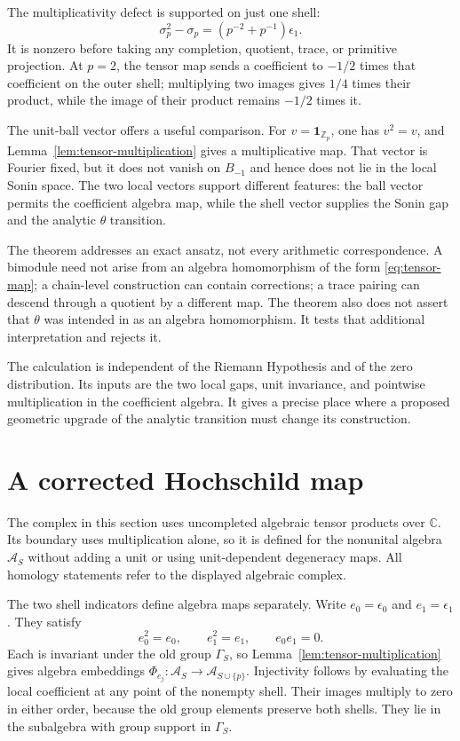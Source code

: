 \documentclass[11pt,letterpaper]{article}
\theoremstyle{definition}
\theoremstyle{remark}
\newcommand{\C}{\mathbb C}
\newcommand{\Z}{\mathbb Z}
\newcommand{\ind}{\mathbf1}
\begin{document}
The multiplicativity defect is supported on just one shell:
\begin{equation}\label{eq:sigma-square}
 \sigma_p^2-\sigma_p=(p^{-2}+p^{-1})\epsilon_1.
\end{equation}
It is nonzero before taking any completion, quotient, trace, or
primitive projection. At $p=2$, the tensor map sends a coefficient
to $-1/2$ times that coefficient on the outer shell; multiplying
two images gives $1/4$ times their product, while the image of
their product remains $-1/2$ times it.

The unit-ball vector offers a useful comparison. For
$v=\ind_{\Z_p}$, one has $v^2=v$, and
Lemma~\ref{lem:tensor-multiplication} gives a multiplicative map.
That vector is Fourier fixed, but it does not vanish on $B_{-1}$
and hence does not lie in the local Sonin space. The two local
vectors support different features: the ball vector permits the
coefficient algebra map, while the shell vector supplies the
Sonin gap and the analytic $\theta$ transition.

The theorem addresses an exact ansatz, not every arithmetic
correspondence. A bimodule need not arise from an algebra
homomorphism of the form \eqref{eq:tensor-map}; a chain-level
construction can contain corrections; a trace pairing can descend
through a quotient by a different map. The theorem also does not
assert that $\theta$ was intended in \cite{CCM} as an algebra
homomorphism. It tests that additional interpretation and rejects it.

The calculation is independent of the Riemann Hypothesis and of
the zero distribution. Its inputs are the two local gaps,
unit invariance, and pointwise multiplication in the coefficient
algebra. It gives a precise place where a proposed geometric
upgrade of the analytic transition must change its construction.

\section{A corrected Hochschild map}

The complex in this section uses uncompleted algebraic tensor
products over $\C$. Its boundary uses multiplication alone, so it
is defined for the nonunital algebra $\mathcal A_S$ without adding
a unit or using unit-dependent degeneracy maps. All homology
statements refer to the displayed algebraic complex.

The two shell indicators define algebra maps separately. Write
$e_0=\epsilon_0$ and $e_1=\epsilon_1$. They satisfy
\begin{equation}\label{eq:orthogonal-shells}
 e_0^2=e_0,\qquad e_1^2=e_1,\qquad e_0e_1=0.
\end{equation}
Each is invariant under the old group $\Gamma_S$, so
Lemma~\ref{lem:tensor-multiplication} gives algebra embeddings
$\Phi_{e_j}:\mathcal A_S\to\mathcal A_{S\cup\{p\}}$.
Injectivity follows by evaluating the local coefficient at any
point of the nonempty shell. Their images multiply to zero in
either order, because the old group elements preserve both
shells. They lie in the subalgebra with group support in
$\Gamma_S$.
\end{document}

